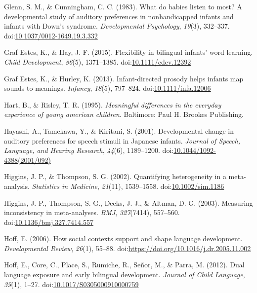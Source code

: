 \documentclass[,man,floatsintext]{apa6}
\begin{document}
\leavevmode\hypertarget{ref-glenn_1983}{}%
Glenn, S. M., \& Cunningham, C. C. (1983). What do babies listen to most? A developmental study of auditory preferences in nonhandicapped infants and infants with Down's syndrome. \emph{Developmental Psychology}, \emph{19}(3), 332--337. doi:\href{https://doi.org/10.1037/0012-1649.19.3.332}{10.1037/0012-1649.19.3.332}

\leavevmode\hypertarget{ref-graf_estes_2015}{}%
Graf Estes, K., \& Hay, J. F. (2015). Flexibility in bilingual infants' word learning. \emph{Child Development}, \emph{86}(5), 1371--1385. doi:\href{https://doi.org/10.1111/cdev.12392}{10.1111/cdev.12392}

\leavevmode\hypertarget{ref-graf_estes_2013}{}%
Graf Estes, K., \& Hurley, K. (2013). Infant-directed prosody helps infants map sounds to meanings. \emph{Infancy}, \emph{18}(5), 797--824. doi:\href{https://doi.org/10.1111/infa.12006}{10.1111/infa.12006}

\leavevmode\hypertarget{ref-hart_1995}{}%
Hart, B., \& Risley, T. R. (1995). \emph{Meaningful differences in the everyday experience of young american children}. Baltimore: Paul H. Brookes Publishing.

\leavevmode\hypertarget{ref-hayashi_2001}{}%
Hayashi, A., Tamekawa, Y., \& Kiritani, S. (2001). Developmental change in auditory preferences for speech stimuli in Japanese infants. \emph{Journal of Speech, Language, and Hearing Research}, \emph{44}(6), 1189--1200. doi:\href{https://doi.org/10.1044/1092-4388(2001/092)}{10.1044/1092-4388(2001/092)}

\leavevmode\hypertarget{ref-higgins_2002}{}%
Higgins, J. P., \& Thompson, S. G. (2002). Quantifying heterogeneity in a meta-analysis. \emph{Statistics in Medicine}, \emph{21}(11), 1539--1558. doi:\href{https://doi.org/10.1002/sim.1186}{10.1002/sim.1186}

\leavevmode\hypertarget{ref-higgins_2003}{}%
Higgins, J. P., Thompson, S. G., Deeks, J. J., \& Altman, D. G. (2003). Measuring inconsistency in meta-analyses. \emph{BMJ}, \emph{327}(7414), 557--560. doi:\href{https://doi.org/10.1136/bmj.327.7414.557}{10.1136/bmj.327.7414.557}

\leavevmode\hypertarget{ref-hoff_2006}{}%
Hoff, E. (2006). How social contexts support and shape language development. \emph{Developmental Review}, \emph{26}(1), 55--88. doi:\href{https://doi.org/https://doi.org/10.1016/j.dr.2005.11.002}{https://doi.org/10.1016/j.dr.2005.11.002}

\leavevmode\hypertarget{ref-hoff_2012}{}%
Hoff, E., Core, C., Place, S., Rumiche, R., Señor, M., \& Parra, M. (2012). Dual language exposure and early bilingual development. \emph{Journal of Child Language}, \emph{39}(1), 1--27. doi:\href{https://doi.org/10.1017/S0305000910000759}{10.1017/S0305000910000759}
\end{document}

